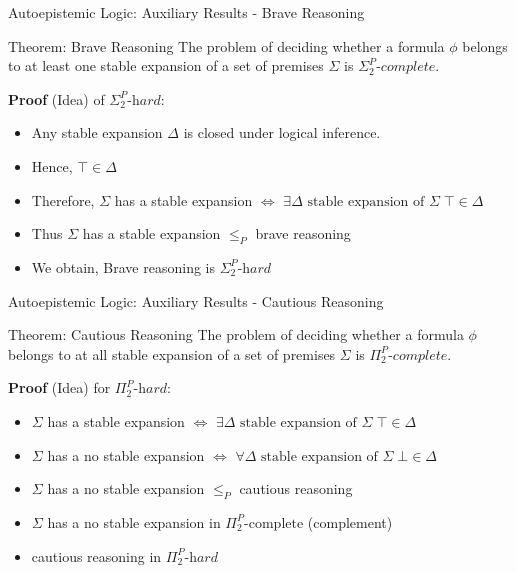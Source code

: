 \documentclass[usenames,dvipsnames, 8pt]{beamer}
\begin{document}
\begin{frame}{Autoepistemic Logic: Auxiliary Results - Brave Reasoning}

\begin{block}{Theorem: Brave Reasoning}
The problem of deciding whether a formula $\phi$ belongs to at least one stable expansion of a set of premises $\Sigma$ is $\Sigma_2^P\textit{-complete}$.
\end{block}

\textbf{Proof} (Idea) of $\Sigma_2^P\textit{-hard}$:
\begin{itemize}[label = {$\bullet$}]
\item Any stable expansion $\Delta$ is closed under logical inference.
\item Hence, $\top \in \Delta$
\item Therefore, $\Sigma$ has a stable expansion $\iff$ $\exists \Delta \text{ stable expansion of } \Sigma \;\top \in \Delta$
\item Thus  $\Sigma$ has a stable expansion $\leq_P$ brave reasoning
\item We obtain, Brave reasoning is $\Sigma_2^P\textit{-hard}$
\end{itemize}

\end{frame}


\begin{frame}{Autoepistemic Logic: Auxiliary Results - Cautious Reasoning}

\begin{block}{Theorem: Cautious Reasoning}
The problem of deciding whether a formula $\phi$ belongs to at all stable expansion of a set of premises $\Sigma$ is $\Pi_2^P\textit{-complete}$.
\end{block}

\textbf{Proof} (Idea) for $\Pi_2^P\textit{-hard}$:
\begin{itemize}[label = {$\bullet$}]
\item $\Sigma$ has a stable expansion $\iff$ $\exists \Delta \text{ stable expansion of } \Sigma \;\top \in \Delta$
\item $\Sigma$ has a no stable expansion $\iff$ $\forall \Delta \text{ stable expansion of } \Sigma \; \bot \in \Delta$
\item $\Sigma$ has a no stable expansion $\leq_P$ cautious reasoning
\item  $\Sigma$ has a no stable expansion in $\Pi_2^P\text{-complete}$ (complement) 
\item cautious reasoning in $\Pi_2^P\textit{-hard}$
\end{itemize}
\end{frame}
\end{document}
